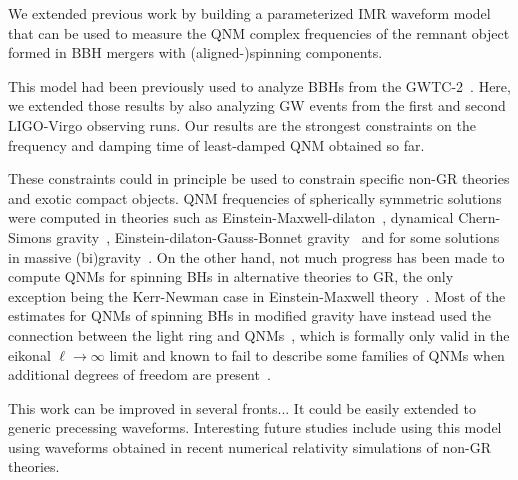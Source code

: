 
We extended previous work by building a parameterized IMR waveform model that can be used to measure the QNM complex frequencies of the remnant object formed in BBH mergers with (aligned-)spinning components.

This model had been previously used to analyze BBHs from the GWTC-2~\cite{Abbott:2020jks}. Here, we extended those results by also analyzing GW events from the first and second LIGO-Virgo observing runs. Our results are the strongest constraints on the frequency and damping time of least-damped QNM obtained so far. 

These constraints could in principle be used to constrain specific non-GR theories and exotic compact objects.
QNM frequencies of spherically symmetric solutions were computed in theories such as Einstein-Maxwell-dilaton~\cite{Ferrari:2000ep}, dynamical Chern-Simons gravity~\cite{Molina:2010fb}, Einstein-dilaton-Gauss-Bonnet gravity~\cite{Pani:2009wy,Blazquez-Salcedo:2016enn,Blazquez-Salcedo:2017txk} and for some solutions in massive (bi)gravity~\cite{Brito:2013wya,Brito:2013yxa,Babichev:2015zub}. On
the other hand, not much progress has been made to compute QNMs for
spinning BHs in alternative theories to GR, the only exception
being the Kerr-Newman case in Einstein-Maxwell
theory~\cite{Pani:2013ija,Pani:2013wsa,Mark:2014aja,Dias:2015wqa}. Most
of the estimates for QNMs of spinning BHs in modified gravity have
instead used the connection between the light ring and
QNMs~\cite{Blazquez-Salcedo:2016enn,Glampedakis:2017dvb,Jai-akson:2017ldo,Glampedakis:2017cgd},
which is formally only valid in the eikonal $\ell \to \infty$ limit
and known to fail to describe some families of QNMs when additional
degrees of freedom are present~\cite{Blazquez-Salcedo:2016enn}. 

This work can be improved in several fronts... It could be easily extended to generic precessing waveforms. Interesting future studies include using this model using waveforms obtained in recent numerical relativity simulations of non-GR theories.